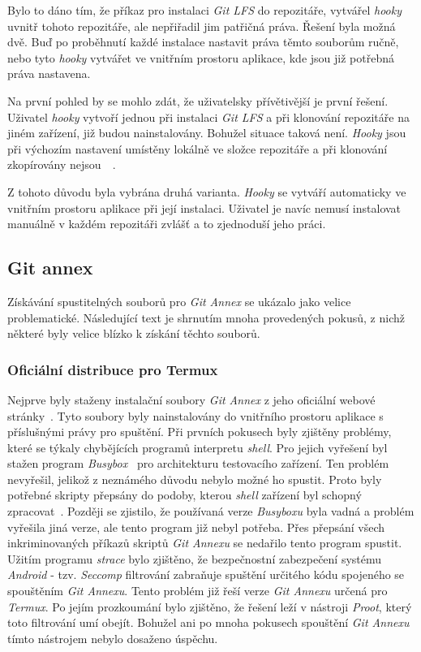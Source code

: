     Bylo to dáno tím, že příkaz pro instalaci \emph{Git LFS} do repozitáře, vytvářel \emph{hooky} uvnitř tohoto repozitáře, ale nepřiřadil jim patřičná práva. Řešení byla možná dvě. Buď po proběhnutí každé instalace nastavit práva těmto souborům ručně, nebo tyto \emph{hooky} vytvářet ve vnitřním prostoru aplikace, kde jsou již potřebná práva nastavena.
    
    Na první pohled by se mohlo zdát, že uživatelsky přívětivější je první řešení. Uživatel \emph{hooky} vytvoří jednou při instalaci \emph{Git LFS} a při klonování repozitáře na jiném zařízení, již budou nainstalovány. Bohužel situace taková není. \emph{Hooky} jsou při výchozím nastavení umístěny lokálně ve složce  repozitáře a při klonování zkopírovány nejsou~~.

    Z tohoto důvodu byla vybrána druhá varianta. \emph{Hooky} se vytváří automaticky ve vnitřním prostoru aplikace při její instalaci. Uživatel je navíc nemusí instalovat manuálně v každém repozitáři zvlášť a to zjednoduší jeho práci.

    \newpage
    \subsection{Git annex}\label{sec:problemy_annex}
    Získávání spustitelných souborů pro \emph{Git Annex} se ukázalo jako velice problematické. Následující text je shrnutím mnoha provedených pokusů, z nichž některé byly velice blízko k získání těchto souborů.

    \subsubsection{Oficiální distribuce pro Termux}
    Nejprve byly staženy instalační soubory \emph{Git Annex} z jeho oficiální webové stránky~. Tyto soubory byly nainstalovány do vnitřního prostoru aplikace s příslušnými právy pro spuštění. Při prvních pokusech byly zjištěny problémy, které se týkaly chybějících programů interpretu \emph{shell}. Pro jejich vyřešení byl stažen program \emph{Busybox}~ pro architekturu testovacího zařízení. Ten problém nevyřešil, jelikož z neznámého důvodu nebylo možné ho spustit. Proto byly potřebné skripty přepsány do podoby, kterou \emph{shell} zařízení byl schopný zpracovat~\label{annex_skripts_overwrite}. Později se zjistilo, že používaná verze \emph{Busyboxu} byla vadná a problém vyřešila jiná verze, ale tento program již nebyl potřeba. Přes přepsání všech inkriminovaných příkazů skriptů \emph{Git Annexu} se nedařilo tento program spustit. Užitím programu \emph{strace} bylo zjištěno, že bezpečnostní zabezpečení systému \emph{Android} - tzv. \emph{Seccomp} filtrování zabraňuje spuštění určitého kódu spojeného se spouštěním \emph{Git Annexu}. Tento problém již řeší verze \emph{Git Annexu} určená pro \emph{Termux}. Po jejím prozkoumání bylo zjištěno, že řešení leží v nástroji \emph{Proot}, který toto filtrování umí obejít. Bohužel ani po mnoha pokusech spouštění \emph{Git Annexu} tímto nástrojem nebylo dosaženo úspěchu.

